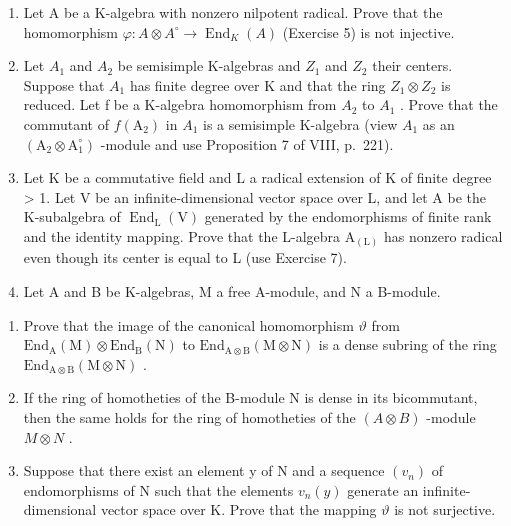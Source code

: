 \begin{enumerate}
\def\labelenumi{\arabic{enumi})}
\setcounter{enumi}{5}
\item
  Let A be a K-algebra with nonzero nilpotent radical. Prove that the homomorphism \(\varphi: A \otimes A^{\circ} \to \operatorname{End}_{K}(A)\) (Exercise 5) is not injective.
\item
  Let \(A_{1}\) and \(A_{2}\) be semisimple K-algebras and \(Z_{1}\) and \(Z_{2}\) their centers. Suppose that \(A_{1}\) has finite degree over K and that the ring \(Z_{1} \otimes Z_{2}\) is reduced. Let f be a K-algebra homomorphism from \(A_{2}\) to \(A_{1}\) . Prove that the commutant of \(f(\mathrm{A}_{2})\) in \(A_{1}\) is a semisimple K-algebra (view \(A_{1}\) as an \((\mathrm{A}_{2} \otimes \mathrm{A}_{1}^{\circ})\) -module and use Proposition 7 of VIII, p.~221).
\item
  Let K be a commutative field and L a radical extension of K of finite degree \textgreater{} 1. Let V be an infinite-dimensional vector space over L, and let A be the K-subalgebra of \(\operatorname{End}_{\mathrm{L}}(\mathrm{V})\) generated by the endomorphisms of finite rank and the identity mapping. Prove that the L-algebra \(\mathrm{A}_{(\mathrm{L})}\) has nonzero radical even though its center is equal to L (use Exercise 7).
\item
  Let A and B be K-algebras, M a free A-module, and N a B-module.
\end{enumerate}

\begin{enumerate}
\def\labelenumi{\alph{enumi})}
\item
  Prove that the image of the canonical homomorphism \(\vartheta\) from \(\mathrm{End}_{\mathrm{A}}(\mathrm{M})\otimes \mathrm{End}_{\mathrm{B}}(\mathrm{N})\) to \(\mathrm{End}_{\mathrm{A}\otimes \mathrm{B}}(\mathrm{M}\otimes \mathrm{N})\) is a dense subring of the ring \(\mathrm{End}_{\mathrm{A}\otimes \mathrm{B}}(\mathrm{M}\otimes \mathrm{N})\) .
\item
  If the ring of homotheties of the B-module N is dense in its bicommutant, then the same holds for the ring of homotheties of the \((A \otimes B)\) -module \(M \otimes N\) .
\item
  Suppose that there exist an element y of N and a sequence \((v_{n})\) of endomorphisms of N such that the elements \(v_{n}(y)\) generate an infinite-dimensional vector space over K. Prove that the mapping \(\vartheta\) is not surjective.
\end{enumerate}

